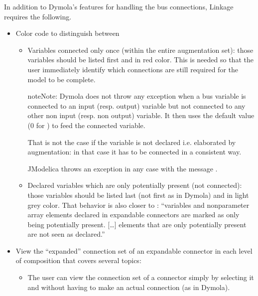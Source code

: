 \documentclass[letterpaper,10pt, openany,english]{sphinxmanual}
\begin{document}
In addition to Dymola’s features for handling the bus connections, Linkage requires the following.
\begin{itemize}
\item {} 
Color code to distinguish between
\begin{itemize}
\item {} 
Variables connected only once (within the entire augmentation set): those variables should be listed first and in red color. This is needed so that the user immediately identify which connections are still required for the model to be complete.

\begin{sphinxadmonition}{note}{Note:}
Dymola does not throw any exception when a  bus variable is connected to an input (resp. output) variable but not connected to any other non input (resp. non output) variable. It then uses the default value (0 for ) to feed the connected variable.

That is not the case if the variable is not declared i.e. elaborated by augmentation: in that case it has to be connected in a consistent way.

JModelica throws an exception in any case with the message .
\end{sphinxadmonition}

\item {} 
Declared variables which are only potentially present (not connected): those variables should be listed last (not first as in Dymola) and in light grey color. That behavior is also closer to  : “variables and non\sphinxhyphen{}parameter array elements declared in expandable connectors are marked as only being potentially present. {[}…{]} elements that are only potentially present are not seen as declared.”

\end{itemize}

\item {} 
View the “expanded” connection set of an expandable connector in each level of composition \textendash{} that covers several topics:
\begin{itemize}
\item {} 
The user can view the connection set of a connector simply by selecting it and without having to make an actual connection (as in Dymola).


\end{itemize}
\end{itemize}
\end{document}
